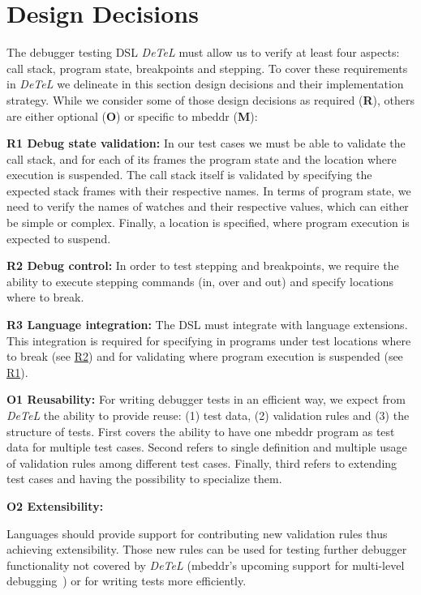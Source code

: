 \section{Design Decisions}
\label{DesignDecisions}

The debugger testing \ac{DSL} \emph{DeTeL} must allow us to verify at least
four aspects: call stack, program state, breakpoints and stepping.
To cover these requirements in \emph{DeTeL} we delineate in this section design
decisions and their implementation strategy. While we consider some of those
design decisions as required (\textbf{R}), others are either optional
(\textbf{O}) or specific to mbeddr (\textbf{M}):


\textbf{\label{R1}R1 Debug state validation:} In our test cases we
must be able to validate the call stack, and for each of its frames 
the program state and the location where execution is suspended. 
The call stack itself is validated by specifying the expected stack
frames with their respective names. In terms of program state, we need to verify
the names of watches and their respective values, which can either be simple
or complex. 
Finally, a location is specified, where program execution is expected to
suspend.

\textbf{\label{R2}R2 Debug control:} In order to test stepping
and breakpoints, we require the ability to execute stepping commands
(in, over and out) and specify locations where to break.

\textbf{\label{R3}R3 Language integration:} The
\ac{DSL} must integrate with language extensions.
This integration is required for specifying in programs under test
locations where to break (see \hyperref[R2]{R2}) and for validating where
program execution is suspended (see \hyperref[R1]{R1}).

\textbf{\label{O1}O1 Reusability:} For writing debugger tests in
an efficient way, we expect from \emph{DeTeL} the ability to provide reuse: (1)
test data, (2) validation rules and (3) the structure of tests. First covers
the ability to have one mbeddr program as test data for multiple test cases.
Second refers to single definition and multiple usage of validation rules among
different test cases. Finally, third refers to extending test cases and
having the possibility to specialize them.

\textbf{\label{O2}O2 Extensibility:} 

Languages should provide support for contributing new
validation rules thus achieving extensibility. Those new rules can be used for
testing further debugger functionality not covered by \emph{DeTeL} (\eg mbeddr's
upcoming support for multi-level debugging~\cite{MultiLevelDebugging:WSRE:breakedForInlining}) 
or for writing tests more efficiently.


